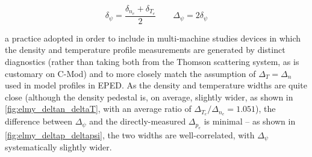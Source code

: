 \begin{equation}\label{eq:wid_eped}
  \delta_\psi = \frac{\delta_{n_e} + \delta_{T_e}}{2}\qquad
  \Delta_\psi = 2\delta_\psi
\end{equation}

\noindent a practice adopted in order to include in multi-machine studies devices in which the density and temperature profile measurements are generated by distinct diagnostics (rather than taking both from the Thomson scattering system, as is customary on C-Mod) and to more closely match the assumption of $\Delta_{T} = \Delta_n$ used in model profiles in EPED.  As the density and temperature widths are quite close (although the density pedestal is, on average, slightly wider, as shown in \cref{fig:elmy_deltan_deltaT}, with an average ratio of $\Delta_{T_e}/\Delta_{n_e} = 1.051$), the difference between $\Delta_\psi$ and the directly-measured $\Delta_{p_e}$ is minimal -- as shown in \cref{fig:elmy_deltap_deltapsi}, the two widths are well-correlated, with $\Delta_\psi$ systematically slightly wider.\nicesectionending

